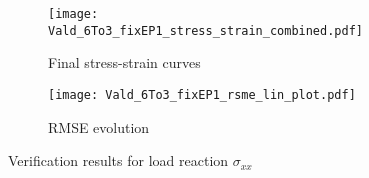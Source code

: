 
\begin{figure}[H]
\centering
\begin{subfigure}[t]{0.495\textwidth}
    \centering
    \texttt{[image: Vald\_6To3\_fixEP1\_stress\_strain\_combined.pdf]}
    \caption{ Final stress-strain curves}
    \label{fig:validStressStrain6to3}
\end{subfigure}
\hfill
\begin{subfigure}[t]{0.495\textwidth}
    \centering
    \centering
    \texttt{[image: Vald\_6To3\_fixEP1\_rsme\_lin\_plot.pdf]}
    \caption{RMSE evolution}
    \label{fig:validRMSE6to3}
\end{subfigure}
\caption{Verification results for load reaction $\sigma_{xx}$}
\label{fig:validRes6to3}
\end{figure}





